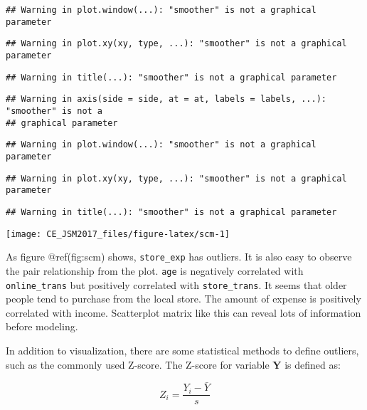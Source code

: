 \documentclass[
]{article}
\begin{document}
\begin{verbatim}
## Warning in plot.window(...): "smoother" is not a graphical parameter
\end{verbatim}

\begin{verbatim}
## Warning in plot.xy(xy, type, ...): "smoother" is not a graphical parameter
\end{verbatim}

\begin{verbatim}
## Warning in title(...): "smoother" is not a graphical parameter
\end{verbatim}

\begin{verbatim}
## Warning in axis(side = side, at = at, labels = labels, ...): "smoother" is not a
## graphical parameter
\end{verbatim}

\begin{verbatim}
## Warning in plot.window(...): "smoother" is not a graphical parameter
\end{verbatim}

\begin{verbatim}
## Warning in plot.xy(xy, type, ...): "smoother" is not a graphical parameter
\end{verbatim}

\begin{verbatim}
## Warning in title(...): "smoother" is not a graphical parameter
\end{verbatim}

\begin{center}\texttt{[image: CE\_JSM2017\_files/figure-latex/scm-1]} \end{center}

As figure @ref(fig:scm) shows, \texttt{store\_exp} has outliers. It is
also easy to observe the pair relationship from the plot. \texttt{age}
is negatively correlated with \texttt{online\_trans} but positively
correlated with \texttt{store\_trans}. It seems that older people tend
to purchase from the local store. The amount of expense is positively
correlated with income. Scatterplot matrix like this can reveal lots of
information before modeling.

In addition to visualization, there are some statistical methods to
define outliers, such as the commonly used Z-score. The Z-score for
variable \(\mathbf{Y}\) is defined as:

\[Z_{i}=\frac{Y_{i}-\bar{Y}}{s}\]
\end{document}
